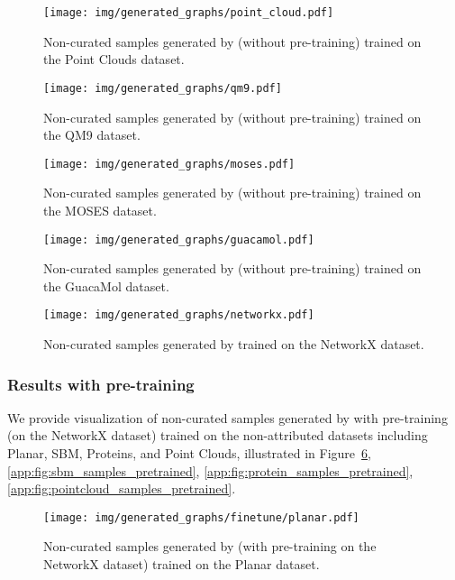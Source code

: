 \begin{figure}[ht]
    \centering
    \texttt{[image: img/generated\_graphs/point\_cloud.pdf]}
    \caption{Non-curated samples generated by \method{} (without pre-training) trained on the Point Clouds dataset.}
    \label{app:fig:pointcloud_samples}
\end{figure}

\begin{figure}[ht]
    \centering
    \texttt{[image: img/generated\_graphs/qm9.pdf]}
    \caption{Non-curated samples generated by \method{} (without pre-training) trained on the QM9 dataset.}
    \label{app:fig:qm9_samples}
\end{figure}

\begin{figure}[ht]
    \centering
    \texttt{[image: img/generated\_graphs/moses.pdf]}
    \caption{Non-curated samples generated by \method{} (without pre-training) trained on the MOSES dataset.}
    \label{app:fig:moses_samples}
\end{figure}

\begin{figure}[ht]
    \centering
    \texttt{[image: img/generated\_graphs/guacamol.pdf]}
    \caption{Non-curated samples generated by \method{} (without pre-training) trained on the GuacaMol dataset.}
    \label{app:fig:guacamol_samples}
\end{figure}

\begin{figure}[ht]
    \centering
    \texttt{[image: img/generated\_graphs/networkx.pdf]}
    \caption{Non-curated samples generated by \method{} trained on the NetworkX dataset.}
    \label{app:fig:networkx_samples}
\end{figure}

\subsubsection{Results with pre-training}
We provide visualization of non-curated samples generated by \method{} with pre-training (on the NetworkX dataset) trained on the non-attributed datasets including Planar, SBM, Proteins, and Point Clouds, illustrated in Figure~\ref{app:fig:planar_samples_pretrained}, \ref{app:fig:sbm_samples_pretrained}, \ref{app:fig:protein_samples_pretrained}, \ref{app:fig:pointcloud_samples_pretrained}.

\begin{figure}[ht]
    \centering
    \texttt{[image: img/generated\_graphs/finetune/planar.pdf]}
    \caption{Non-curated samples generated by \method{} (with pre-training on the NetworkX dataset) trained on the Planar dataset.}
    \label{app:fig:planar_samples_pretrained}
\end{figure}

